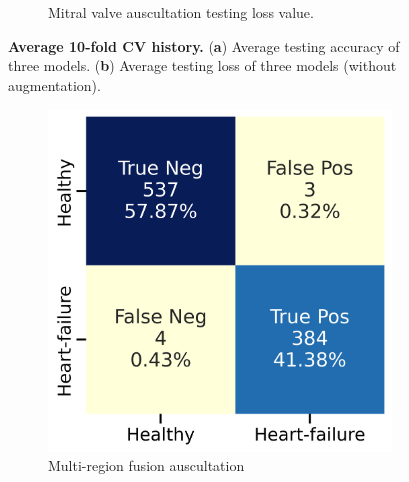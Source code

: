 \begin{figure}[h]
\begin{subfigure}{0.48\linewidth}
		\caption{Mitral valve auscultation testing loss value.}
		\label{FIG:Average curve.b}%
	\end{subfigure}
\caption{\textbf{Average 10-fold CV history.} (\textbf{a}) Average testing accuracy of three models. (\textbf{b}) Average testing loss of three models (without augmentation).}
\label{FIG:Average curve}
\end{figure}

\begin{figure}[htbp]
    \centering
    \begin{subfigure}[b]{0.4\textwidth}
        \centering
        \includegraphics[width=\textwidth]{./figs/results/Confusion Matrix 2.png}
        \caption{Multi-region fusion auscultation}
        \label{fig:mitral_valve_2}
    \end{subfigure}
    \hfill
    \begin{subfigure}[b]{0.4\textwidth}
        \centering

\end{subfigure}
\end{figure}
